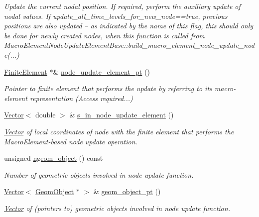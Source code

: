 \begin{DoxyCompactItemize}
\begin{DoxyCompactList}\small\item\em Update the current nodal position. If required, perform the auxiliary update of nodal values. If update\+\_\+all\+\_\+time\+\_\+levels\+\_\+for\+\_\+new\+\_\+node==true, previous positions are also updated -- as indicated by the name of this flag, this should only be done for newly created nodes, when this function is called from Macro\+Element\+Node\+Update\+Element\+Base\+::build\+\_\+macro\+\_\+element\+\_\+node\+\_\+update\+\_\+node(...) \end{DoxyCompactList}\item 
\hyperlink{classoomph_1_1FiniteElement}{Finite\+Element} $\ast$\& \hyperlink{classoomph_1_1MacroElementNodeUpdateNode_a42cf903a08c77142beb14087d768437d}{node\+\_\+update\+\_\+element\+\_\+pt} ()
\begin{DoxyCompactList}\small\item\em Pointer to finite element that performs the update by referring to its macro-\/element representation (Access required...) \end{DoxyCompactList}\item 
\hyperlink{classoomph_1_1Vector}{Vector}$<$ double $>$ \& \hyperlink{classoomph_1_1MacroElementNodeUpdateNode_a257cc8ea07e10ba7e21a04613bd37a39}{s\+\_\+in\+\_\+node\+\_\+update\+\_\+element} ()
\begin{DoxyCompactList}\small\item\em \hyperlink{classoomph_1_1Vector}{Vector} of local coordinates of node with the finite element that performs the Macro\+Element-\/based node update operation. \end{DoxyCompactList}\item 
unsigned \hyperlink{classoomph_1_1MacroElementNodeUpdateNode_abf17a352b005d110874c1f4fe715faeb}{ngeom\+\_\+object} () const
\begin{DoxyCompactList}\small\item\em Number of geometric objects involved in node update function. \end{DoxyCompactList}\item 
\hyperlink{classoomph_1_1Vector}{Vector}$<$ \hyperlink{classoomph_1_1GeomObject}{Geom\+Object} $\ast$ $>$ \& \hyperlink{classoomph_1_1MacroElementNodeUpdateNode_a3874b8d7149e06c48faddd6f3ebee5ce}{geom\+\_\+object\+\_\+pt} ()
\begin{DoxyCompactList}\small\item\em \hyperlink{classoomph_1_1Vector}{Vector} of (pointers to) geometric objects involved in node update function. \end{DoxyCompactList}\item 

\end{DoxyCompactItemize}
